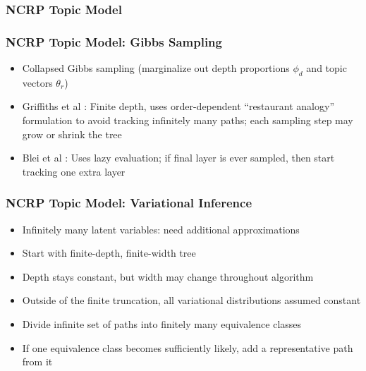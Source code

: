 \begin{frame}
\frametitle{NCRP Topic Model}
\begin{center}
\end{center}
\end{frame}

\begin{frame}
\frametitle{NCRP Topic Model: Gibbs Sampling}
\begin{itemize}[<+->]
\item Collapsed Gibbs sampling (marginalize out depth proportions $\phi_d$ and topic vectors $\theta_r$)
\item Griffiths et al \cite{griffiths2004hierarchical}: Finite depth, uses order-dependent ``restaurant analogy'' formulation to avoid tracking infinitely many paths; each sampling step may grow or shrink the tree
\item Blei et al \cite{blei2010ncrp}: Uses lazy evaluation; if final layer is ever sampled, then start tracking one extra layer
\end{itemize}
\end{frame}

\begin{frame}
\frametitle{NCRP Topic Model: Variational Inference}
\begin{itemize}[<+->]
\item Infinitely many latent variables: need additional approximations
\item Start with finite-depth, finite-width tree
\item Depth stays constant, but width may change throughout algorithm
\item Outside of the finite truncation, all variational distributions assumed constant
\item Divide infinite set of paths into finitely many equivalence classes
\item If one equivalence class becomes sufficiently likely, add a representative path from it
\end{itemize}
\end{frame}

